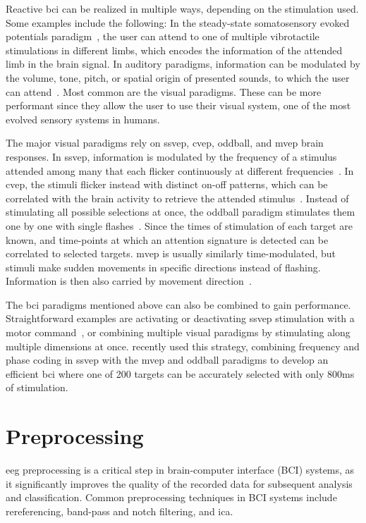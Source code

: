 Reactive \ac{bci} can be realized in multiple ways, depending on the stimulation used.
Some examples include the following:
In the steady-state somatosensory evoked potentials paradigm~\cite{Petit2021}, the user
can attend to one of multiple vibrotactile stimulations in different limbs, which
encodes the information of the attended limb in the brain signal.
In auditory paradigms, information can be modulated by the volume, tone, pitch, or
spatial origin of presented sounds, to which the user can attend~\cite{Kaongoen2017}.
Most common are the visual paradigms.
These can be more performant since they allow the user to use their visual system, one
of the most evolved sensory systems in humans.

The major visual paradigms rely on \ac{ssvep}, \ac{cvep}, oddball, and \ac{mvep} brain
responses.
In \ac{ssvep}, information is modulated by the frequency of a stimulus attended among
many that each flicker continuously at different frequencies~\cite{Chen2021}.
In \ac{cvep}, the stimuli flicker instead with distinct on-off patterns, which can be
correlated with the brain activity to retrieve the attended stimulus~\cite{Sun2022}.
Instead of stimulating all possible selections at once, the oddball paradigm stimulates
them one by one with single flashes~\cite{Pan2022}.
Since the times of stimulation of each target are known, and time-points at which an
attention signature is detected can be correlated to selected targets.
\Ac{mvep} is usually similarly time-modulated, but stimuli make sudden movements in
specific directions instead of flashing.
Information is then also carried by movement direction~\cite{Libert2021a,Libert2022}.

The \ac{bci} paradigms mentioned above can also be combined to gain performance.
Straightforward examples are activating or deactivating \ac{ssvep} stimulation with a
motor command~\cite{Neeling2019}, or combining multiple visual paradigms by stimulating
along multiple dimensions at once.
\textcite{Han2023} recently used this strategy, combining frequency and phase coding in
\ac{ssvep} with the \ac{mvep} and oddball paradigms to develop an efficient \ac{bci}
where one of 200 targets can be accurately selected with only 800ms of stimulation.

\section{Preprocessing}
\label{sec:bci/preprocessing}

\ac{eeg} preprocessing is a critical step in brain-computer interface (BCI) systems, as
it significantly improves the quality of the recorded data for subsequent analysis and
classification.
Common preprocessing techniques in BCI systems include rereferencing, band-pass and
notch filtering, and \ac{ica}.

